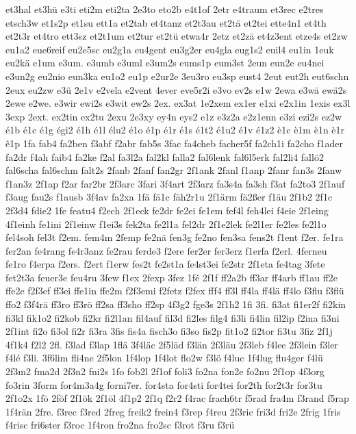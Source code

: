 {et3hal
et3hü
e3ti
eti2m
eti2ta
2e3to
eto2b
e4t1of
2etr
e4traum
et3rec
e2tres
etsch3w
et1s2p
et1su
ett1a
et2tab
et4tanz
et2t3au
et2tä
et2tei
ette4n1
et4th
et2t3r
et4tro
ett3sz
et2t1um
et2tur
et2tü
etwa4r
2etz
et2zä
et4z3ent
etze4s
et2zw
eu1a2
eue6reif
eu2e5sc
eu2g1a
eu4gent
eu3g2er
eu4gla
eug1s2
euil4
eu1in
1euk
eu2kä
e1um
e3um.
e3umb
e3uml
e3um2s
eums1p
eum3st
2eun
eun2e
eu4nei
e3un2g
eu2nio
eun3ka
eu1o2
eu1p
e2ur2e
3eu3ro
eu3sp
eust4
2eut
eut2h
eut6schn
2eux
eu2zw
e3ü
2e1v
e2vela
e2vent
4ever
eve5r2i
e3vo
ev2s
e1w
2ewa
e3wä
ewä2s
2ewe
e2we.
e3wir
ewi2s
e3wit
ew2s
2ex.
ex3at
1e2xem
ex1er
e1xi
e2x1in
1exis
ex3l
3exp
2ext.
ex2tin
ex2tu
2exu
2e3xy
ey4n
eys2
e1z
e3z2a
e2z1enn
e3zi
ezi2s
ez2w
é1b
é1c
é1g
égi2
é1h
é1l
élu2
é1o
é1p
é1r
é1s
é1t2
é1u2
é1v
é1z2
è1c
è1m
è1n
è1r
ê1p
1fa
fab4
fa2ben
f3abf
f2abr
fab5s
3fac
fa4cheb
facher5f
fa2ch1i
fa2cho
f1ader
fa2dr
f4ah
faib4
fa2ke
f2al
fa3l2a
fal2kl
falla2
fal6lenk
fal6l5erk
fal2li4
fallö2
fal6scha
fal6schm
falt2s
2fanb
2fanf
fan2gr
2f1ank
2fanl
f1anp
2fanr
fan3s
2fanw
f1an3z
2f1ap
f2ar
far2br
2f3arc
3fari
3f4art
2f3arz
fa3s4a
fa3sh
f3at
fa2to3
2f1auf
f3aug
fau2s
f1ausb
3f4av
fa2xa
1fä
fä1c
fäh2r1u
2f1ärm
fä2ßer
f1äu
2f1b2
2f1c
2f3d4
fdie2
1fe
featu4
f2ech
2f1eck
fe2dr
fe2ei
fe1em
fef4l
feh4lei
f4eie
2f1eing
4f1einh
fe1ini
2f1einw
f1ei3s
fek2ta
fe2l1a
fel2dr
2f1e2lek
fe2l1er
fe2les
fe2l1o
fel4soh
fel3t
f2em.
fem4m
2femp
fe2nä
fen3g
fe2no
fen3sa
fens2t
f1ent
f2er.
fe1ra
fer2an
fe4rang
fe4r3anz
fe2rau
ferde3
f2ere
fer2er
fer3erz
f1erfa
f2erl.
4ferneu
fe1ro
f4erpa
f2ers.
f2ert
f1erw
fes2t
fe2st1a
fe4st3ei
fe2str
2f1eta
fe4tag
3fete
fet2t3a
feuer3e
feu4ru
3few
f1ex
2fexp
3fez
1fé
2f1f
ff2a2b
ff3ar
ff4arb
ff1au
ff2e
ffe2e
f2f3ef
ff3ei
ffe1in
ffe2m
f2f3emi
f2fetz
f2fex
fff4
ff3l
ff4la
ff4lä
ff4lo
f3flu
f3flü
ffo2
f3f4rä
ff3ro
ff3rö
ff2sa
ff3sho
ff2sp
4f3g2
fge3s
2f1h2
1fi
3fi.
fi3at
fi1er2f
fi2kin
fi3kl
fik1o2
fi2kob
fi2kr
fi2l1an
fil4auf
fil3d
fi2les
filg4
fi3li
fi4lin
fil2ip
f2ina
fi3ni
2f1int
fi2o
fi3ol
fi2r
fi3ra
3fis
fis4a
fisch3o
fi3so
fis2p
fit1o2
fi2tor
fi3tu
3fiz
2f1j
4f1k4
f2l2
2fl.
f3lad
f3lap
1flä
3f4läc
2f5läd
f3län
2f3läu
2f3leb
f4lee
2f3lein
f3ler
f4lé
f3li.
3f6lim
fli4ne
2f5lon
1f4lop
1f4lot
flo2w
f3lö
f4luc
1f4lug
flu4ger
f4lü
2f3m2
fma2d
2f3n2
fni2s
1fo
fob2l
2f1of
foli3
fo2na
fon2e
fo2nu
2f1op
4f3org
fo3rin
3form
for4m3a4g
forni7er.
for4sta
for4sti
for4tei
for2th
for2t3r
for3tu
2f1o2x
1fö
2föf
2f1ök
2f1öl
4f1p2
2f1q
f2r2
f4rac
frach6tr
f5rad
fra4m
f3rand
f5rap
1f4rän
2fre.
f3rec
f3red
2freg
freik2
frein4
f3rep
f4reu
2f3ric
fri3d
fri2e
2frig
1fris
f4risc
fri6ster
f3roc
1f4ron
fro2na
fro2sc
f3rot
f3ru
f3rü
}
